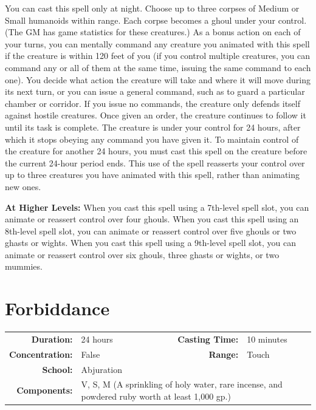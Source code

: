 \documentclass[12pt,showtrims]{memoir}
\begin{document}
\vspace{1\baselineskip}\noindent You can cast this spell only at night. Choose up to three corpses of Medium or Small humanoids within range. Each corpse becomes a ghoul under your control. (The GM has game statistics for these creatures.) As a bonus action on each of your turns, you can mentally command any creature you animated with this spell if the creature is within 120 feet of you (if you control multiple creatures, you can command any or all of them at the same time, issuing the same command to each one). You decide what action the creature will take and where it will move during its next turn, or you can issue a general command, such as to guard a particular chamber or corridor. If you issue no commands, the creature only defends itself against hostile creatures. Once given an order, the creature continues to follow it until its task is complete. The creature is under your control for 24 hours, after which it stops obeying any command you have given it. To maintain control of the creature for another 24 hours, you must cast this spell on the creature before the current 24-hour period ends. This use of the spell reasserts your control over up to three creatures you have animated with this spell, rather than animating new ones.

\vspace{8pt} \noindent\textbf{At Higher Levels:} When you cast this spell using a 7th-level spell slot, you can animate or reassert control over four ghouls. When you cast this spell using an 8th-level spell slot, you can animate or reassert control over five ghouls or two ghasts or wights. When you cast this spell using a 9th-level spell slot, you can animate or reassert control over six ghouls, three ghasts or wights, or two mummies.
\newpage
\section*{Forbiddance}

{
\small\centering\vspace{-6pt}
\begin{tabular}{rlrl}
\toprule

\textbf{Duration:} & 24 hours &
\textbf{Casting Time:} & 10 minutes \\
\textbf{Concentration:} & False &
\textbf{Range:} & Touch \\
\textbf{School:} & Abjuration \\
\textbf{Components:} & \multicolumn{3}{p{0.7\textwidth}}{V, S, M (A sprinkling of holy water, rare incense, and powdered ruby worth at least 1,000 gp.)}\\

\bottomrule
\end{tabular}
}
\end{document}

